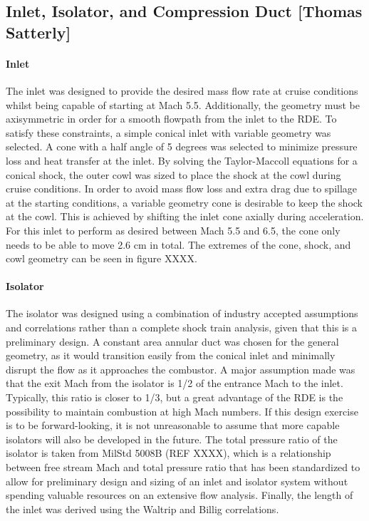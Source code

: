 \subsection{Inlet, Isolator, and Compression Duct [Thomas Satterly]}
\paragraph{Inlet}

The inlet was designed to provide the desired mass flow rate at cruise conditions whilst being capable of starting at Mach 5.5. Additionally, the geometry must be axisymmetric in order for a smooth flowpath from the inlet to the RDE. To satisfy these constraints, a simple conical inlet with variable geometry was selected. 
A cone with a half angle of 5 degrees was selected to minimize pressure loss and heat transfer at the inlet. By solving the Taylor-Maccoll equations for a conical shock, the outer cowl was sized to place the shock at the cowl during cruise conditions. In order to avoid mass flow loss and extra drag due to spillage at the starting conditions, a variable geometry cone is desirable to keep the shock at the cowl. This is achieved by shifting the inlet cone axially during acceleration. For this inlet to perform as desired between Mach 5.5 and 6.5, the cone only needs to be able to move 2.6 cm in total. The extremes of the cone, shock, and cowl geometry can be seen in figure XXXX.

\paragraph{Isolator}

    The isolator was designed using a combination of industry accepted assumptions and correlations rather than a complete shock train analysis, given that this is a preliminary design. A constant area annular duct was chosen for the general geometry, as it would transition easily from the conical inlet and minimally disrupt the flow as it approaches the combustor. 
A major assumption made was that the exit Mach from the isolator is 1/2 of the entrance Mach to the inlet. Typically, this ratio is closer to 1/3, but a great advantage of the RDE is the possibility to maintain combustion at high Mach numbers. If this design exercise is to be forward-looking, it is not unreasonable to assume that more capable isolators will also be developed in the future. 
    The total pressure ratio of the isolator is taken from MilStd 5008B (REF XXXX), which is a relationship between free stream Mach and total pressure ratio that has been standardized to allow for preliminary design and sizing of an inlet and isolator system without spending valuable resources on an extensive flow analysis. Finally, the length of the inlet was derived using the Waltrip and Billig correlations.


